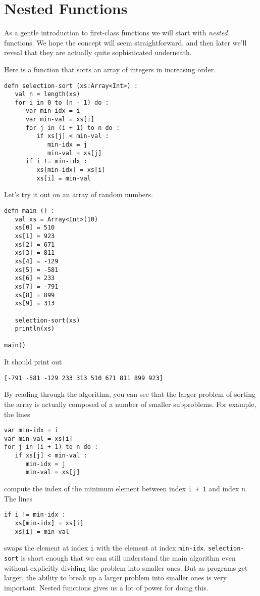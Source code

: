 \documentclass[10pt,oneside]{book}
\begin{document}
\section{Nested Functions}
As a gentle introduction to first-class functions we will start with {\em nested} functions. We hope the concept will seem straightforward, and then later we'll reveal that they are actually quite sophisticated underneath.

Here is a function that sorts an array of integers in increasing order.
\begin{lstlisting}
defn selection-sort (xs:Array<Int>) :
   val n = length(xs)
   for i in 0 to (n - 1) do :
      var min-idx = i
      var min-val = xs[i]
      for j in (i + 1) to n do :
         if xs[j] < min-val :
            min-idx = j
            min-val = xs[j]
      if i != min-idx :
         xs[min-idx] = xs[i]
         xs[i] = min-val
\end{lstlisting}
Let's try it out on an array of random numbers.
\begin{lstlisting}
defn main () :
   val xs = Array<Int>(10)
   xs[0] = 510
   xs[1] = 923
   xs[2] = 671
   xs[3] = 811
   xs[4] = -129
   xs[5] = -581
   xs[6] = 233
   xs[7] = -791
   xs[8] = 899
   xs[9] = 313

   selection-sort(xs)
   println(xs)

main()
\end{lstlisting}
It should print out
\begin{lstlisting}
[-791 -581 -129 233 313 510 671 811 899 923]
\end{lstlisting}

By reading through the algorithm, you can see that the larger problem of sorting the array is actually composed of a number of smaller subproblems. For example, the lines
\begin{lstlisting}
var min-idx = i
var min-val = xs[i]
for j in (i + 1) to n do :
   if xs[j] < min-val :
      min-idx = j
      min-val = xs[j]
\end{lstlisting}
compute the index of the minimum element between index \texttt{\frenchspacing i + 1} and index \texttt{\frenchspacing n}. The lines
\begin{lstlisting}
if i != min-idx :
   xs[min-idx] = xs[i]
   xs[i] = min-val
\end{lstlisting}
swaps the element at index \texttt{\frenchspacing i} with the element at index \texttt{\frenchspacing min-idx}. \texttt{\frenchspacing selection-sort} is short enough that we can still understand the main algorithm even without explicitly dividing the problem into smaller ones. But as programs get larger, the ability to break up a larger problem into smaller ones is very important. Nested functions gives us a lot of power for doing this. 
\end{document}
